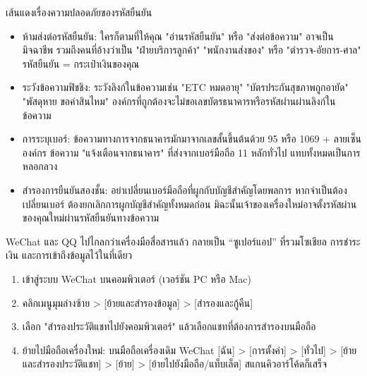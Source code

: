 \begin{tcbwarn}{เส้นแดงเรื่องความปลอดภัยของรหัสยืนยัน}
\begin{itemize}
  \item ห้ามส่งต่อรหัสยืนยัน: ใครก็ตามที่ให้คุณ "อ่านรหัสยืนยัน" หรือ "ส่งต่อข้อความ" อาจเป็นมิจฉาชีพ รวมถึงคนที่อ้างว่าเป็น "ฝ่ายบริการลูกค้า" "พนักงานส่งของ" หรือ "ตำรวจ-อัยการ-ศาล" รหัสยืนยัน = กระเป๋าเงินของคุณ
  \item ระวังข้อความฟิชชิง: ระวังลิงก์ในข้อความเช่น "ETC หมดอายุ" "บัตรประกันสุขภาพถูกอายัด" "พัสดุหาย ขอค่าสินไหม" องค์กรที่ถูกต้องจะไม่ขอเลขบัตรธนาคารหรือรหัสผ่านผ่านลิงก์ในข้อความ
  \item การระบุเบอร์: ข้อความทางการจากธนาคารมักมาจากเลขสั้นขึ้นต้นด้วย 95 หรือ 1069 + ลายเซ็นองค์กร ข้อความ "แจ้งเตือนจากธนาคาร" ที่ส่งจากเบอร์มือถือ 11 หลักทั่วไป แทบทั้งหมดเป็นการหลอกลวง
  \item สำรองการยืนยันสองชั้น: อย่าเปลี่ยนเบอร์มือถือที่ผูกกับบัญชีสำคัญโดยพลการ หากจำเป็นต้องเปลี่ยนเบอร์ ต้องยกเลิกการผูกบัญชีสำคัญทั้งหมดก่อน มิฉะนั้นเจ้าของเครื่องใหม่อาจตั้งรหัสผ่านของคุณใหม่ผ่านรหัสยืนยันทางข้อความ
\end{itemize}

\end{tcbwarn}


WeChat และ QQ ไปไกลกว่าเครื่องมือสื่อสารแล้ว กลายเป็น “ซูเปอร์แอป” ที่รวมโซเชียล การชำระเงิน และการเข้าถึงข้อมูลไว้ในที่เดียว


\begin{enumerate}
  \item เข้าสู่ระบบ WeChat บนคอมพิวเตอร์ (เวอร์ชัน PC หรือ Mac)
  \item คลิกเมนูมุมล่างซ้าย > [ย้ายและสำรองข้อมูล] > [สำรองและกู้คืน]
  \item เลือก "สำรองประวัติแชทไปยังคอมพิวเตอร์" แล้วเลือกแชทที่ต้องการสำรองบนมือถือ
  \item ย้ายไปมือถือเครื่องใหม่: บนมือถือเครื่องเดิม WeChat [ฉัน] > [การตั้งค่า] > [ทั่วไป] > [ย้ายและสำรองประวัติแชท] > [ย้าย] > [ย้ายไปยังมือถือ/แท็บเล็ต] สแกนคิวอาร์โค้ดก็เสร็จ
\end{enumerate}


